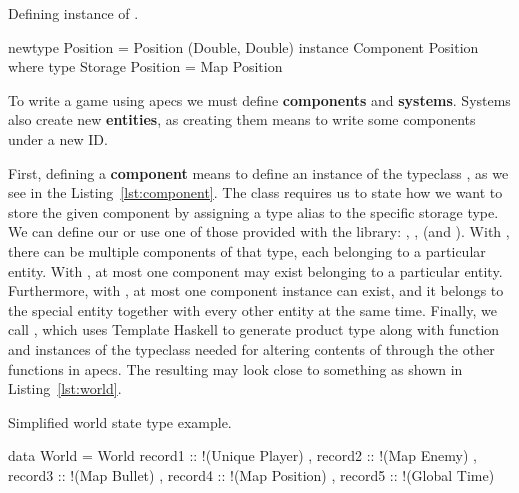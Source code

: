 \documentclass[
  digital, %
  color,   %
  table,   %
  oneside, %
  lof,     %
  lot,     %
]{fithesis3}
\begin{document}
\begin{listing}[H]
\caption{Defining instance of .}
\begin{haskell}
newtype Position = Position (Double, Double)
instance Component Position where
    type Storage Position = Map Position
\end{haskell}
\label{lst:component}
\end{listing}

To write a game using apecs we must define \textbf{components} and \textbf{systems}.
Systems also create new \textbf{entities},
as creating them means to write some components under a new ID.

First, defining a \textbf{component} means to define an instance of the typeclass
, as we see in the Listing~\ref{lst:component}.
The  class
requires us to state how we want to store the given component
by assigning a type alias to the specific storage type.
We can define our  or use one of those provided
with the library: , ,  (and ).
With , there can be multiple components of that type,
each belonging to a particular entity.
With , at most one component may exist
belonging to a particular entity. Furthermore,
with , at most one component instance can exist,
and it belongs to the special  entity together
with every other entity at the same time. Finally, we call ,
which uses Template Haskell to generate  product type
along with  function and instances of the 
typeclass needed for altering contents of  through
the other functions in apecs. The resulting 
may look close to something as shown in Listing~\ref{lst:world}.

\begin{listing}[H]
\caption{Simplified world state type example.}
\begin{haskell}
data World =
    World
    { record1 :: !(Unique Player)
    , record2 :: !(Map Enemy)
    , record3 :: !(Map Bullet)
    , record4 :: !(Map Position)
    , record5 :: !(Global Time)
    }
\end{haskell}
\label{lst:world}
\end{listing}
\end{document}
